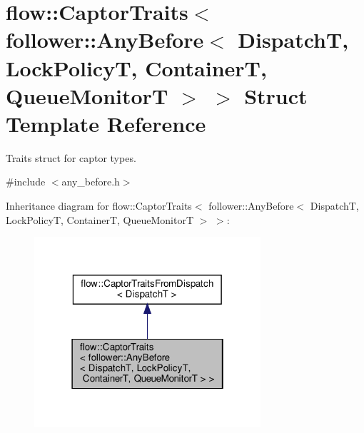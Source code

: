 \hypertarget{structflow_1_1_captor_traits_3_01follower_1_1_any_before_3_01_dispatch_t_00_01_lock_policy_t_00_55050b2eb17fc5bc754f0ec7f3a869fd}{}\section{flow\+:\+:Captor\+Traits$<$ follower\+:\+:Any\+Before$<$ DispatchT, Lock\+PolicyT, ContainerT, Queue\+MonitorT $>$ $>$ Struct Template Reference}
\label{structflow_1_1_captor_traits_3_01follower_1_1_any_before_3_01_dispatch_t_00_01_lock_policy_t_00_55050b2eb17fc5bc754f0ec7f3a869fd}


Traits struct for captor types.  




{\ttfamily \#include $<$any\+\_\+before.\+h$>$}



Inheritance diagram for flow\+:\+:Captor\+Traits$<$ follower\+:\+:Any\+Before$<$ DispatchT, Lock\+PolicyT, ContainerT, Queue\+MonitorT $>$ $>$\+:
\nopagebreak
\begin{figure}[H]
\begin{center}
\leavevmode
\includegraphics[width=238pt]{structflow_1_1_captor_traits_3_01follower_1_1_any_before_3_01_dispatch_t_00_01_lock_policy_t_00_67d78ed751c12dd4271a62e51f7847c5}
\end{center}
\end{figure}


